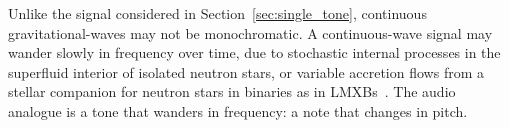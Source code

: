 \documentclass[paper-main.tex]{subfiles}
\begin{document}

Unlike the signal considered in Section~\ref{sec:single_tone}, continuous gravitational-waves may not be monochromatic.
A continuous-wave signal may wander slowly in frequency over time, due to stochastic internal processes in the superfluid interior of isolated neutron stars\cite{MelatosDouglassSimula:2015,Jones:2010}, or variable accretion flows from a stellar companion for neutron stars in binaries as in LMXBs~\cite{BildstenTB:1998}. 
The audio analogue is a tone that wanders in frequency: a note that changes in pitch. 
\end{document}
